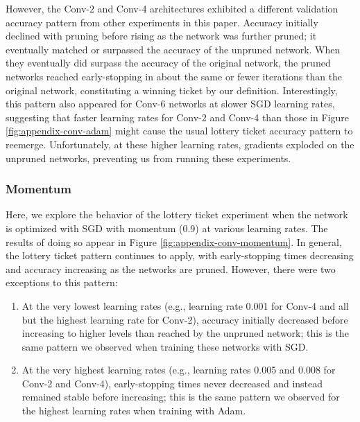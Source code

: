 However, the Conv-2 and Conv-4 architectures exhibited a different validation accuracy
pattern from other experiments in this paper. Accuracy initially declined with pruning before rising as the network was further pruned; it eventually
matched or surpassed the accuracy of the unpruned network. When they eventually did surpass the accuracy of the original network,
the pruned networks reached early-stopping in
about the same or fewer iterations than the original network, constituting a winning ticket by our definition. Interestingly, this pattern also appeared
for Conv-6 networks at slower SGD learning rates, suggesting that faster learning rates for Conv-2 and Conv-4 than those in Figure \ref{fig:appendix-conv-adam}
might cause the usual lottery ticket accuracy pattern to reemerge. Unfortunately, at these higher learning rates, gradients exploded on the unpruned networks,
preventing us from running these experiments.

\subsubsection{Momentum}

Here, we explore the behavior of the lottery ticket experiment when the network is optimized with SGD with momentum (0.9) at various learning rates.
The results of doing so appear in Figure \ref{fig:appendix-conv-momentum}. In general, the lottery ticket pattern continues to apply, with early-stopping times
decreasing and accuracy increasing as the networks are pruned. However, there were two exceptions to this pattern:
\begin{enumerate}
\item At the very lowest learning rates
(e.g., learning rate 0.001 for Conv-4 and all but the highest learning rate for Conv-2), accuracy initially decreased before increasing to higher levels than reached
by the unpruned network; this is the same pattern we observed when training these networks with SGD. 
\item At the very highest learning rates (e.g., learning rates 0.005 and 0.008 for Conv-2 and Conv-4), early-stopping times never decreased and instead remained
stable before increasing; this is the same pattern we observed for the highest learning rates when training with Adam.
\end{enumerate}


